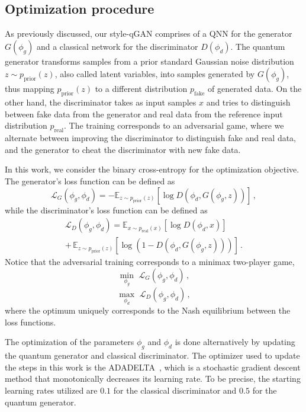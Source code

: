\documentclass[twocolumn,preprintnumbers,superscriptaddress]{revtex4-2}
\begin{document}
\subsection{Optimization procedure}

As previously discussed, our style-qGAN comprises of a QNN for the generator $G(\phi_g)$ and a classical network for the discriminator $D(\phi_d)$. The quantum generator transforms samples from a prior standard Gaussian noise distribution $z \sim p_{\mathrm{prior}}(z)$, also called latent variables, into samples generated by $G(\phi_g)$, thus mapping $p_{\mathrm{prior}}(z)$ to a different distribution $p_{\mathrm{fake}}$ of generated data. On the other hand, the discriminator takes as input samples $x$ and tries to distinguish between fake data from the generator and real data from the reference input distribution $p_{\mathrm{real}}$. The training corresponds to an adversarial game, where we alternate between improving the discriminator to distinguish fake and real data, and the generator to cheat the discriminator with new fake data.

In this work, we consider the binary cross-entropy for the optimization objective. The generator's loss function can be defined as
\begin{equation}
   \mathcal{L}_G(\phi_g,\phi_d) = -\mathbb{E}_{z \sim p_{\mathrm{prior}}(z)}[\log D(\phi_d,G(\phi_g,z))]  \,,
\end{equation}
while the discriminator's loss function can be defined as
\begin{equation}
\begin{split}
   \mathcal{L}_D(\phi_g,\phi_d) = \mathbb{E}_{x \sim p_{\mathrm{real}}(x)}[\log D(\phi_d,x)] \\+\, \mathbb{E}_{z \sim p_{\mathrm{prior}}(z)}[\log (1-D(\phi_d,G(\phi_g,z)))]\,.
\end{split}
\end{equation}
Notice that the adversarial training corresponds to a minimax two-player game,
\begin{equation}
 \underset{\phi_g}{\min}\,\,\mathcal{L}_G(\phi_g,\phi_d)  \,,
\end{equation}
\begin{equation}
 \underset{\phi_d}{\max}\,\,\mathcal{L}_D(\phi_g,\phi_d)  \,,
\end{equation}
where the optimum uniquely corresponds to the Nash equilibrium between the loss functions.

The optimization of the parameters $\phi_g$ and $\phi_d$ is done alternatively by updating the quantum generator and classical discriminator. The optimizer used to update the steps in this work is the ADADELTA~\cite{zeiler2012adadelta}, which is a stochastic gradient descent method that monotonically decreases its learning rate. To be precise, the starting learning rates utilized are $0.1$ for the classical discriminator and $0.5$ for the quantum generator.
\end{document}
